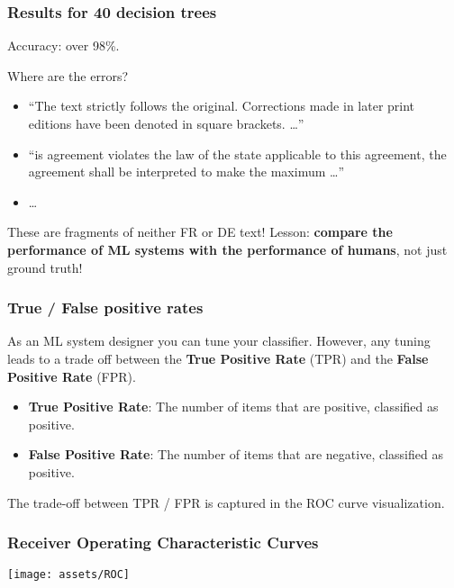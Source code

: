 \documentclass{beamer} %
\newcommand\emc[1]{\textcolor{brightblue}{\textbf{#1}}}
\begin{document}
\begin{frame}
\frametitle{Results for 40 decision trees}

Accuracy: over 98\%.

\vspace{3mm}
Where are the errors? 
\begin{itemize}
  \item ``The text strictly follows the original. Corrections made in later print editions have been denoted in square brackets. \ldots''
  \item ``is agreement violates the law of the state applicable to this agreement, the agreement shall be interpreted to make the maximum \ldots''
  \item \ldots
\end{itemize}

These are fragments of neither FR or DE text! Lesson: \emc{compare the performance of ML systems with the performance of humans}, not just ground truth!

\end{frame}

\begin{frame}
\frametitle{True / False positive rates}

As an ML system designer you can tune your classifier. However, any tuning leads to a trade off between the \emc{True Positive Rate} (TPR) and the \emc{False Positive Rate} (FPR).

\begin{itemize}
  \item \emc{True Positive Rate}: The number of items that are positive, classified as positive.
  \item \emc{False Positive Rate}: The number of items that are negative, classified as positive.
\end{itemize}

\vspace{3mm}
The trade-off between TPR / FPR is captured in the ROC curve visualization.

\end{frame}

\begin{frame}
\frametitle{Receiver Operating Characteristic Curves}

\begin{center}
\texttt{[image: assets/ROC]}
\end{center}

\end{frame}
\end{document}
